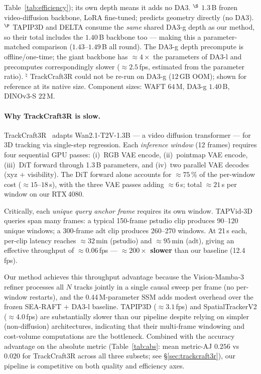 \documentclass[11pt,a4paper]{article}
\begin{document}
\begin{table}[h]
{Table~\ref{tab:efficiency}); its own depth means it adds no DA3.
$^{\S}$ $1.3$\,B frozen video-diffusion backbone, LoRA fine-tuned; predicts geometry directly (no DA3).
$^{\P}$ TAPIP3D and DELTA consume the \emph{same} shared DA3-g depth as our method, so their total includes
the $1.40$\,B backbone too --- making this a parameter-matched comparison ($1.43$--$1.49$\,B all round).
The DA3-g depth precompute is offline/one-time; the giant backbone has ${\approx}4\times$ the parameters of
DA3-l and precomputes correspondingly slower (${\approx}2.5$\,fps, estimated from the parameter ratio).
$^{\natural}$ TrackCraft3R could not be re-run on DA3-g ($12$\,GB OOM); shown for reference at its native size.
Component sizes: WAFT $64$\,M, DA3-g $1.40$\,B, DINOv3-S $22$\,M.}
\end{table}

\paragraph{Why TrackCraft3R is slow.}
TrackCraft3R~\cite{trackcraft3r} adapts Wan2.1-T2V-1.3B --- a video diffusion transformer ---
for 3D tracking via single-step regression.
Each \emph{inference window} (12 frames) requires four sequential GPU passes:
(i)~RGB VAE encode, (ii)~pointmap VAE encode, (iii)~DiT forward through 1.3\,B
parameters, and (iv)~two parallel VAE decodes (xyz $+$ visibility).
The DiT forward alone accounts for ${\approx}75$\,\% of the per-window cost (${\approx}15$--$18$\,s),
with the three VAE passes adding ${\approx}6$\,s; total ${\approx}21$\,s per window on our RTX\,4080.

Critically, each \emph{unique query anchor frame} requires its own window.
TAPVid-3D queries span many frames: a typical 150-frame pstudio clip produces
90--120 unique windows; a 300-frame adt clip produces 260--270 windows.
At 21\,s each, per-clip latency reaches ${\approx}32$\,min (pstudio) and ${\approx}95$\,min (adt),
giving an effective throughput of ${\approx}0.06$\,fps --- \textbf{${\approx}200\times$ slower}
than our baseline (12.4\,fps).

Our method achieves this throughput advantage because the Vision-Mamba-3 refiner processes
all $N$ tracks jointly in a single causal sweep per frame (no per-window restarts),
and the 0.44\,M-parameter SSM adds modest overhead over the frozen SEA-RAFT $+$ DA3-l baseline.
TAPIP3D (${\approx}3.1$\,fps) and SpatialTrackerV2 (${\approx}4.0$\,fps) are substantially
slower than our pipeline despite relying on simpler (non-diffusion) architectures,
indicating that their multi-frame windowing and cost-volume computations are the bottleneck.
Combined with the accuracy advantage on the absolute metric
(Table~\ref{tab:abs}: mean metric-AJ $0.256$ vs $0.020$ for TrackCraft3R across all three subsets;
see \S\ref{sec:trackcraft3r}),
our pipeline is competitive on both quality and efficiency axes.


\clearpage


\end{document}
